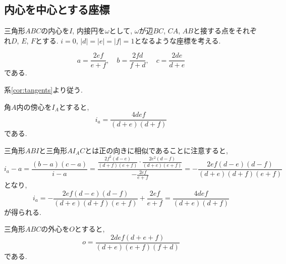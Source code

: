 \subsection{内心を中心とする座標}
\begin{bset}
三角形$ABC$の内心を$I$, 内接円を$\omega$として, $\omega$が辺$BC$, $CA$, $AB$と接する点をそれぞれ$D$, $E$, $F$とする.
$i=0$, $\lvert d\rvert=\lvert e\rvert=\lvert f\rvert=1$となるような座標を考える.
\end{bset}
%
\begin{bthm}
\begin{equation}
a=\frac{2ef}{e+f},\quad b=\frac{2fd}{f+d},\quad c=\frac{2de}{d+e}
\end{equation}
である.
\end{bthm}
\begin{prf*}
系\ref{cor:tangents}より従う.
\end{prf*}
%
\begin{bthm}\label{thm:excenter-i}
角$A$内の傍心を$I_A$とすると,
\begin{equation}
i_a=\frac{4def}{(d+e)(d+f)}
\end{equation}
である.
\end{bthm}
\begin{prf*}
三角形$ABI$と三角形$AI_AC$とは正の向きに相似であることに注意すると,
\[i_a-a=\frac{(b-a)(c-a)}{i-a}=\frac{\frac{2f^2(d-e)}{(d+f)(e+f)}\cdot\frac{2e^2(d-f)}{(d+e)(e+f)}}{-\frac{2ef}{e+f}}=-\frac{2ef(d-e)(d-f)}{(d+e)(d+f)(e+f)}\]
となり,
\[i_a=-\frac{2ef(d-e)(d-f)}{(d+e)(d+f)(e+f)}+\frac{2ef}{e+f}=\frac{4def}{(d+e)(d+f)}\]
が得られる.
\end{prf*}
%
\begin{bthm}\label{thm:circumcenter-i}
三角形$ABC$の外心を$O$とすると,
\begin{equation}
o=\frac{2def(d+e+f)}{(d+e)(e+f)(f+d)}
\end{equation}
である.
\end{bthm}
